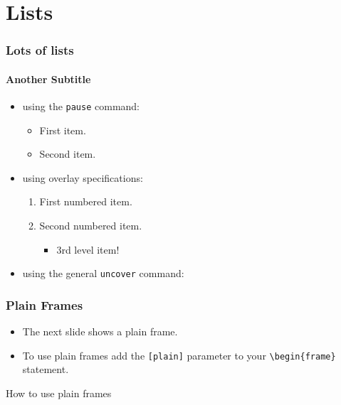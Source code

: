 \section{Lists}
\begin{frame}
        \frametitle{Lots of lists}
        \framesubtitle{Another Subtitle}
        \begin{itemize}
          \item using the \texttt{pause} command:
          \begin{itemize}
            \item First item.
            \pause
            \item Second item.
          \end{itemize}
          \item using overlay specifications:
          \begin{enumerate}
            \item<3-> First numbered item.
            \item<4-> Second numbered item.
            \begin{itemize}
              \item 3rd level item!
            \end{itemize}
          \end{enumerate}
          \item using the general \texttt{uncover} command:
          \begin{itemize}
          \end{itemize}
        \end{itemize}
\end{frame}

\begin{frame}[fragile]
        \frametitle{Plain Frames}
        \begin{itemize}
      \item The next slide shows a plain frame.
      \item To use plain frames add the \verb![plain]! parameter to your \verb!\begin{frame}! statement.
    \end{itemize}
        \begin{block}{How to use plain frames}
    \scriptsize
    
        \end{block}
\end{frame}

